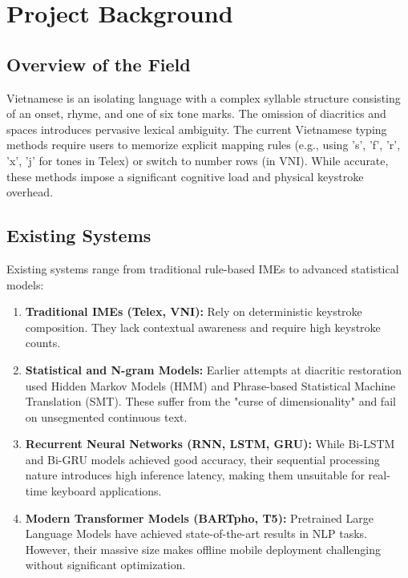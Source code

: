 \section{Project Background}

\subsection{Overview of the Field}
Vietnamese is an isolating language with a complex syllable structure consisting of an onset, rhyme, and one of six tone marks. The omission of diacritics and spaces introduces pervasive lexical ambiguity. The current Vietnamese typing methods require users to memorize explicit mapping rules (e.g., using 's', 'f', 'r', 'x', 'j' for tones in Telex) or switch to number rows (in VNI). While accurate, these methods impose a significant cognitive load and physical keystroke overhead.

\subsection{Existing Systems}
Existing systems range from traditional rule-based IMEs to advanced statistical models:
\begin{enumerate}
    \item \textbf{Traditional IMEs (Telex, VNI):} Rely on deterministic keystroke composition. They lack contextual awareness and require high keystroke counts.
    \item \textbf{Statistical and N-gram Models:} Earlier attempts at diacritic restoration used Hidden Markov Models (HMM) and Phrase-based Statistical Machine Translation (SMT). These suffer from the "curse of dimensionality" and fail on unsegmented continuous text.
    \item \textbf{Recurrent Neural Networks (RNN, LSTM, GRU):} While Bi-LSTM and Bi-GRU models achieved good accuracy, their sequential processing nature introduces high inference latency, making them unsuitable for real-time keyboard applications.
    \item \textbf{Modern Transformer Models (BARTpho, T5):} Pretrained Large Language Models have achieved state-of-the-art results in NLP tasks. However, their massive size makes offline mobile deployment challenging without significant optimization.
\end{enumerate}

